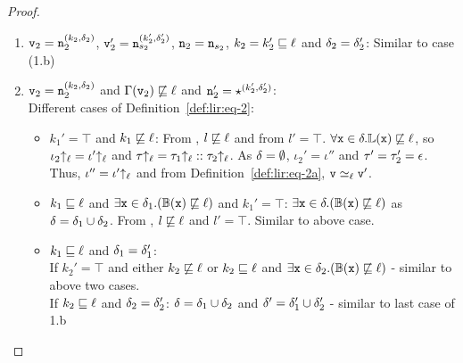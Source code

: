 \begin{proof}
\begin{itemize}[leftmargin=.5in]
\begin{enumerate}
      \begin{enumerate}
      \item $\texttt{v}_2 = \texttt{n}_2^{(k_2, \delta_2)}$, $\texttt{v}_2' = \texttt{n}_{s_2}^{(k_2',
          \delta_2')}$, $\texttt{n}_2 = \texttt{n}_{s_2}$, $k_2 = k_2' \sqsubseteq
        \ell$ and $\delta_2 = \delta_2'$: Similar to case (1.b) 

      \item $\texttt{v}_2 = \texttt{n}_2^{(k_2, \delta_2)}$ and $\Gamma(\texttt{v}_2) \not\sqsubseteq
        \ell$ and  $\texttt{n}_2' = \star^{(k_2',\delta_2')}$:\\
        Different cases of Definition~\ref{def:lir:eq-2}:

        \begin{itemize}
        \item $k_1' = \top$ and $k_1 \not\sqsubseteq \ell$:
          From , $l \not\sqsubseteq \ell$ and from 
          $l' =\top$. $\forall \texttt{x} \in \delta. \mathbb{L}(\texttt{x}) \not\sqsubseteq
          \ell$, so $\iota_2{\uparrow_\ell} = \iota'{\uparrow_\ell}$ and $\tau{\uparrow_\ell}
          = \tau_1{\uparrow_\ell} :: \tau_2{\uparrow_\ell}$. As $\delta =
          \emptyset$, $\iota_2' = \iota''$ and $\tau' = \tau_2' =
          \epsilon$. Thus, $\iota'' = \iota'{\uparrow_\ell}$ and from 
          Definition~\ref{def:lir:eq-2a}, $\texttt{v} \simeq_\ell \texttt{v}'$.

        \item $k_1 \sqsubseteq \ell$ and $\exists \texttt{x} \in
          \delta_1. (\mathbb{B}(\texttt{x}) \not\sqsubseteq 
          \ell)$ and $k_1' = \top$: $\exists \texttt{x} \in
          \delta. (\mathbb{B}(\texttt{x}) \not\sqsubseteq \ell)$ as $\delta =
          \delta_1 \cup \delta_2$. From , $l \not\sqsubseteq
          \ell$ and $l' =\top$. Similar to above case.

        \item $k_1 \sqsubseteq \ell$ and $
          \delta_1 = \delta_1'$: \\
          If $k_2' = \top$ and either $k_2
          \not\sqsubseteq \ell$ or $k_2 \sqsubseteq \ell$
          and $\exists \texttt{x} \in \delta_2. (\mathbb{B}(\texttt{x}) \not\sqsubseteq 
          \ell)$ - similar to above two cases.\\
          If $k_2 \sqsubseteq \ell$ and $\delta_2 = \delta_2'$:  
          $\delta = \delta_1 \cup \delta_2$ and $\delta' =
          \delta_1' \cup \delta_2'$ - similar to last case of 1.b
        \end{itemize}
      \end{enumerate}
    \end{enumerate}
    

\end{itemize}
\end{proof}

